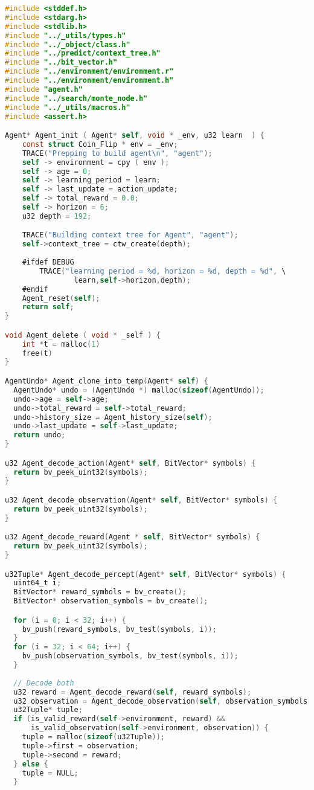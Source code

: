 \documentclass[fancychapters]{report}   	%
\begin{document}
\begin{lstlisting}[language=C,caption={agent.c}]
#include <stddef.h>
#include <stdarg.h>
#include <stdlib.h>
#include "../_utils/types.h"
#include "../_object/class.h"
#include "../predict/context_tree.h"
#include "../bit_vector.h"
#include "../environment/environment.r"
#include "../environment/environment.h"
#include "agent.h"
#include "../search/monte_node.h"
#include "../_utils/macros.h"
#include <assert.h>

Agent* Agent_init ( Agent* self, void * _env, u32 learn  ) {
    const struct Coin_Flip * env = _env;
    TRACE("Prepping to build agent\n", "agent");
    self -> environment = cpy ( env );
    self -> age = 0;
    self -> learning_period = learn;
    self -> last_update = action_update;
    self -> total_reward = 0.0;
    self -> horizon = 6;
    u32 depth = 192;

    TRACE("Building context tree for Agent", "agent");
    self->context_tree = ctw_create(depth);
    
    #ifdef DEBUG
        TRACE("learning period = %d, horizon = %d, depth = %d", \
                learn,self->horizon,depth);
    #endif
    Agent_reset(self);
    return self;
}

void Agent_delete ( void * _self ) {
    int *t = malloc(1)
    free(t)
}

AgentUndo* Agent_clone_into_temp(Agent* self) {
  AgentUndo* undo = (AgentUndo *) malloc(sizeof(AgentUndo));
  undo->age = self->age;
  undo->total_reward = self->total_reward;
  undo->history_size = Agent_history_size(self);
  undo->last_update = self->last_update;
  return undo;
}

u32 Agent_decode_action(Agent* self, BitVector* symbols) {
  return bv_peek_uint32(symbols);
}

u32 Agent_decode_observation(Agent* self, BitVector* symbols) {
  return bv_peek_uint32(symbols);
}

u32 Agent_decode_reward(Agent * self, BitVector* symbols) {
  return bv_peek_uint32(symbols);
}

u32Tuple* Agent_decode_percept(Agent* self, BitVector* symbols) {
  uint64_t i;
  BitVector* reward_symbols = bv_create();
  BitVector* observation_symbols = bv_create();

  for (i = 0; i < 32; i++) {
    bv_push(reward_symbols, bv_test(symbols, i));
  }
  for (i = 32; i < 64; i++) {
    bv_push(observation_symbols, bv_test(symbols, i));
  }
  
  // Decode both
  u32 reward = Agent_decode_reward(self, reward_symbols);
  u32 observation = Agent_decode_observation(self, observation_symbols);
  u32Tuple* tuple;
  if (is_valid_reward(self->environment, reward) &&
      is_valid_observation(self->environment, observation)) {
    tuple = malloc(sizeof(u32Tuple));
    tuple->first = observation;
    tuple->second = reward;
  } else {
    tuple = NULL;
  }
  

\end{lstlisting}
\end{document}
